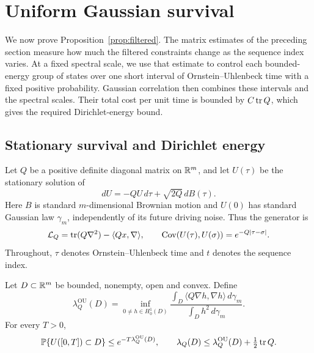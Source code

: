 \section{Uniform Gaussian survival}\label{sec:survival}

We now prove Proposition~\ref{prop:filtered}.  The matrix estimates of the
preceding section measure how much the filtered constraints change as the
sequence index varies.  At a fixed spectral scale, we use that estimate
to control each bounded-energy group of states over one short interval
of Ornstein--Uhlenbeck time with a fixed positive probability.
Gaussian correlation then combines these intervals and the
spectral scales.  Their total cost per unit time is bounded by
$C\operatorname{tr} Q$, which gives the required Dirichlet-energy bound.

\subsection{Stationary survival and Dirichlet energy}

Let $Q$ be a positive definite diagonal matrix on $\mathbb R^m$, and let $U(\tau)$
be the stationary solution of
\[
 dU=-QU\,d\tau+\sqrt{2Q}\,dB(\tau).
\]
Here $B$ is standard $m$-dimensional Brownian motion and $U(0)$ has standard
Gaussian law $\gamma_m$, independently of its future driving noise.  Thus
the generator is
\[
 \mathcal L_Q=\operatorname{tr}(Q\nabla^2)-\langle Qx,\nabla\rangle,
 \qquad
 \operatorname{Cov}(U(\tau),U(\sigma))=e^{-Q|\tau-\sigma|}.
\]
Throughout, $\tau$ denotes Ornstein--Uhlenbeck time and $t$ denotes the
sequence index.

\begin{lemma}\label{lem:ou-energy}
Let $D\subset\mathbb R^m$ be bounded, nonempty, open and convex.  Define
\[
 \lambda_Q^{\mathrm{OU}}(D)
 =\inf_{0\ne h\in H_0^1(D)}
 \frac{\int_D\langle Q\nabla h,\nabla h\rangle\,d\gamma_m}
      {\int_D h^2\,d\gamma_m}.
\]
For every $T>0$,
\begin{equation}\label{eq:ou-comparison}
 \mathbb P\{U([0,T])\subset D\}
 \le e^{-T\lambda_Q^{\mathrm{OU}}(D)},
 \qquad
 \lambda_Q(D)\le\lambda_Q^{\mathrm{OU}}(D)+\tfrac12\operatorname{tr} Q.
\end{equation}
\end{lemma}

